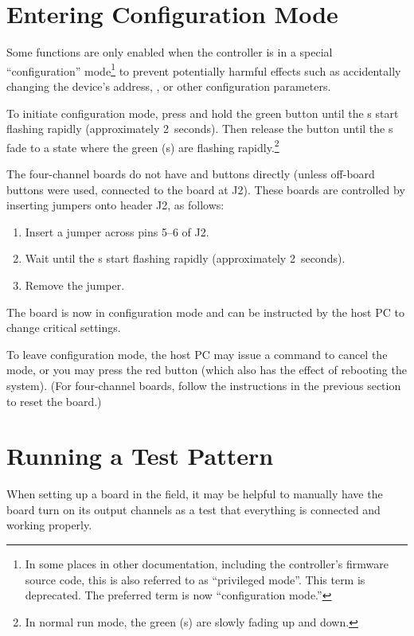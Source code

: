 \documentclass[letterpaper,twoside,onecolumn,openright,final]{memoir}
\begin{document}
\section{Entering Configuration Mode}\label{sec:configmode}
Some functions are only enabled when the controller is in a special ``configuration'' mode\footnote{In
some places in other documentation, including the controller's firmware source code, this is also
referred to as ``privileged mode''.  This term is deprecated. The preferred term is now
``configuration mode.''} to prevent potentially harmful effects such as accidentally changing
the device's address, , or other configuration parameters.

To initiate configuration mode, press and hold the green  button until the s start
flashing rapidly (approximately 2~seconds).  Then release the  button until the s
fade to a state where the green (s) are flashing rapidly.\footnote{In normal run mode,
the green (s) are slowly fading up and down.}

The four-channel boards do not have  and  buttons directly (unless off-board
buttons were used, connected to the board at J2).  These boards are controlled by inserting jumpers onto
header J2, as follows:
\begin{enumerate}
	\item	Insert a jumper across pins 5--6 of J2.  
	\item	Wait until the s start flashing rapidly (approximately 2~seconds).
	\item	Remove the jumper.
\end{enumerate}

The board is now in configuration mode and can be instructed by the host PC to change critical
settings.

To leave configuration mode, the host PC may issue a command to cancel the mode, or you may press
the red  button (which also has the effect of rebooting the system).
(For four-channel boards, follow the instructions in the previous section to reset the board.)

\section{Running a Test Pattern}
When setting up a board in the field, it may be helpful to manually have the board turn on its
output channels as a test that everything is connected and working properly.
\end{document}

